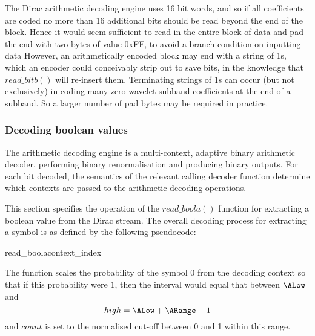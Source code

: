 \begin{informative}
The Dirac arithmetic decoding engine uses 16 bit words, and so if all coefficients are
coded no more than 16 additional bits should be read beyond the end of the block. Hence it 
would seem sufficient to read in the entire block of data and pad the end with two bytes of value 0xFF,
to avoid a branch condition on inputting data
However, an arithmetically encoded block may end with a string of 1s, which an encoder could
conceivably strip out to save bits, in the knowledge that $read\_bitb()$ will re-insert them. Terminating
strings of 1s can occur (but not exclusively) in coding many zero wavelet subband coefficients at the end
of a subband. So a larger number of pad bytes may be required in practice.
\end{informative}

\subsubsection{Decoding boolean values}
\label{arithreadbool}

The arithmetic decoding engine is a multi-context, adaptive binary
arithmetic decoder, performing binary renormalisation and producing
binary outputs. For each bit decoded, the semantics of the relevant
calling decoder function determine which contexts are passed to the
arithmetic decoding operations. 

This section specifies the operation of the $read\_boola()$ function
for extracting a boolean value from the Dirac stream. The overall decoding
process for extracting a symbol is as defined by the following
pseudocode:

\begin{pseudo}{read\_boola}{context\_index}
\bsELSE
\bsEND
{}
\bsEND
{}
\end{pseudo}

\begin{informative}
The function scales the probability of the symbol $0$ from the decoding context
so that if this probability were $1$, then the interval would equal that between
 $\ALow$ and 
 \[high=\ALow+\ARange-1\]
and $count$ is set to the normalised cut-off between 0 and 1 within this range.
\end{informative}


